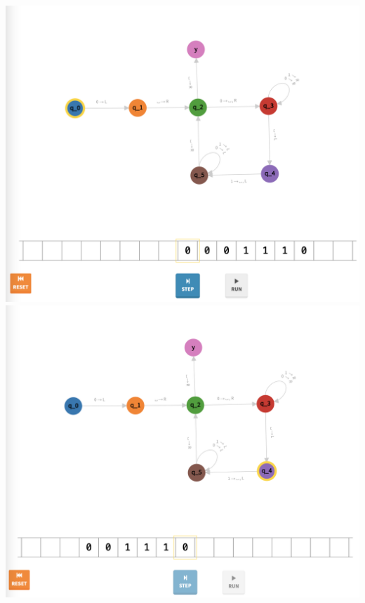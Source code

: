 \documentclass[a4paper]{article}
\begin{document}
\begin{center}
\includegraphics[width=\textwidth]{TM1.9}
\includegraphics[width=\textwidth]{TM1.10}
\end{center}
\newpage
\end{document}

